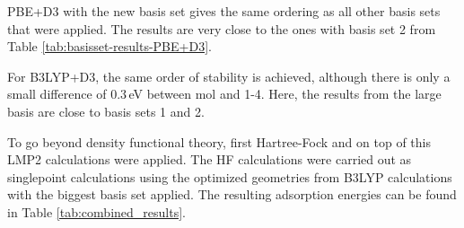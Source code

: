\documentclass[11pt,DIV=13,BCOR=5mm,a4paper,headinclude]{scrbook}
\begin{document}
PBE+D3 with the new basis set gives the same ordering as all other basis sets that were applied.
The results are very close to the ones with basis set 2 from Table \ref{tab:basisset-results-PBE+D3}.


For B3LYP+D3, the same order of stability is achieved, although there is only a small difference of $0.3\,$eV between mol and 1-4.
Here, the results from the large basis are close to basis sets 1 and 2.


To go beyond density functional theory, first Hartree-Fock and on top of this LMP2 calculations were applied.
The HF calculations were carried out as singlepoint calculations using the optimized geometries from B3LYP calculations with the biggest basis set applied.
The resulting adsorption energies can be found in Table \ref{tab:combined_results}. %
\end{document}
